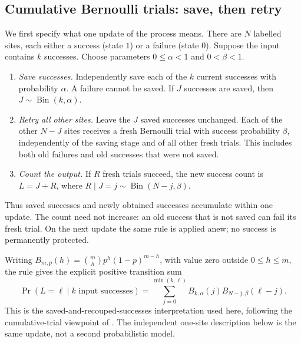 \documentclass[11pt,reqno]{amsart}
\theoremstyle{definition}
\theoremstyle{remark}
\begin{document}
\subsection*{Cumulative Bernoulli trials: save, then retry}
We first specify what one update of the process means. There are $N$
labelled sites, each either a success (state $1$) or a failure (state
$0$). Suppose the input contains $k$ successes. Choose parameters
$0\le\alpha<1$ and $0<\beta<1$.
\begin{enumerate}
\item \emph{Save successes.} Independently save each of the $k$ current
successes with probability $\alpha$. A failure cannot be saved.
If $J$ successes are saved, then $J\sim\operatorname{Bin}(k,\alpha)$.
\item \emph{Retry all other sites.} Leave the $J$ saved successes
unchanged. Each of the other $N-J$ sites receives a fresh Bernoulli
trial with success probability $\beta$, independently of the saving
stage and of all other fresh trials. This includes both old failures
and old successes that were not saved.
\item \emph{Count the output.} If $R$ fresh trials succeed, the new
success count is $L=J+R$, where
$R\mid J=j\sim\operatorname{Bin}(N-j,\beta)$.
\end{enumerate}
Thus saved successes and newly obtained successes accumulate within
one update. The count need not increase: an old success that is not
saved can fail its fresh trial. On the next update the same rule is
applied anew; no success is permanently protected.

Writing $B_{m,p}(h)=\binom mhp^h(1-p)^{m-h}$, with value zero outside
$0\le h\le m$, the rule gives the explicit positive transition sum
\[
\Pr(L=\ell\mid k\text{ input successes})
=\sum_{j=0}^{\min(k,\ell)}B_{k,\alpha}(j)B_{N-j,\beta}(\ell-j).
\]
This is the saved-and-recouped-successes interpretation used here,
following the cumulative-trial viewpoint of \cite{HoareRahman1984}.
The independent one-site description below is the same update, not a
second probabilistic model.
\end{document}
